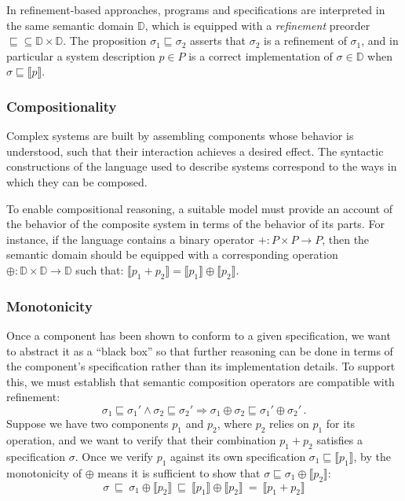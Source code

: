 \documentclass[sigplan,10pt,review,anonymous]{acmart}
\begin{document}
In refinement-based approaches,
programs and specifications are interpreted in the same
semantic domain $\mathbb{D}$,
which is equipped with a \emph{refinement} preorder
${\sqsubseteq} \subseteq \mathbb{D} \times \mathbb{D}$.
The proposition $\sigma_1 \sqsubseteq \sigma_2$
asserts that $\sigma_2$ is a refinement of $\sigma_1$,
and in particular a system description $p \in P$ is a correct implementation
of $\sigma \in \mathbb{D}$ when
$\sigma \sqsubseteq \llbracket p \rrbracket$.


\subsubsection{Compositionality} %

Complex systems are built by assembling components
whose behavior is understood,
such that their interaction achieves a desired effect.
The syntactic constructions of
the language used to describe systems
correspond to the ways in which they can be composed.

To enable compositional reasoning,
a suitable model must provide an account of
the behavior of the composite system
in terms of the behavior of its parts.
For instance,
if the language contains a binary operator
${+} : P \times P \rightarrow P$,
then the semantic domain should be equipped with
a corresponding operation
${\oplus} : \mathbb{D} \times \mathbb{D} \rightarrow \mathbb{D}$
such that:
$\llbracket p_1 + p_2 \rrbracket =
 \llbracket p_1 \rrbracket \oplus \llbracket p_2 \rrbracket$.


\subsubsection{Monotonicity} %

\cbstart
Once a component has been shown to conform to a given specification,
we want to abstract it as a ``black box''
so that further reasoning can be done in terms of
the component's specification rather than its implementation details.
To support this,
we must establish that semantic composition operators
are compatible with refinement:
\[ \sigma_1 \sqsubseteq \sigma_1' \wedge
   \sigma_2 \sqsubseteq \sigma_2' \Rightarrow
   \sigma_1 \oplus \sigma_2 \sqsubseteq \sigma_1' \oplus \sigma_2' \,. \]
Suppose we have two components $p_1$ and $p_2$,
where $p_2$ relies on $p_1$ for its operation,
and we want to verify that their combination $p_1 + p_2$
satisfies a specification $\sigma$.
Once we verify $p_1$ against its own specification
$\sigma_1 \sqsubseteq \llbracket p_1 \rrbracket$,
by the monotonicity of ${\oplus}$ means it is sufficient to show that
\cbend
$\sigma \sqsubseteq \sigma_1 \oplus \llbracket p_2 \rrbracket$:
\[
   \sigma \:\sqsubseteq\:
   \sigma_1 \oplus \llbracket p_2 \rrbracket \:\sqsubseteq\:
   \llbracket p_1 \rrbracket \oplus \llbracket p_2 \rrbracket \:=\:
   \llbracket p_1 + p_2 \rrbracket
\]
\end{document}
